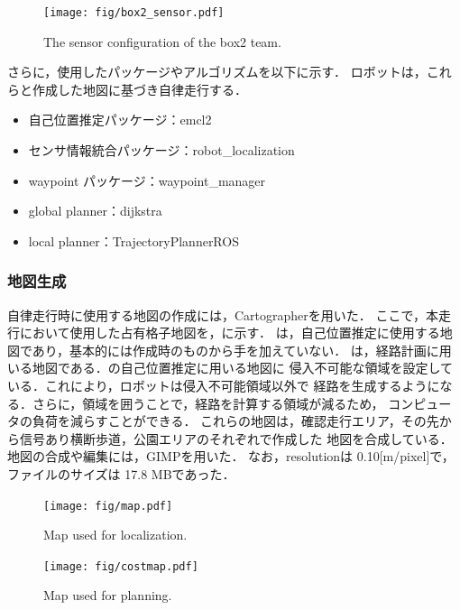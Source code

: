 \documentclass[twocolumn, 9pt]{jsproceedings}
\begin{document}
\begin{figure}[h!]
  \centering
  \texttt{[image: fig/box2\_sensor.pdf]}
  \caption{The sensor configuration of the box2 team.}
  \label{fig:box2-sensor}
\end{figure}


さらに，使用したパッケージやアルゴリズムを以下に示す．
ロボットは，これらと作成した地図に基づき自律走行する．

\begin{itemize}
  \item 自己位置推定パッケージ：emcl2\cite{emcl2}
  \item センサ情報統合パッケージ：robot\_localization\cite{robotlocalization}
  \item waypoint パッケージ：waypoint\_manager\cite{waypoint}
  \item global planner：dijkstra
  \item local planner：TrajectoryPlannerROS
\end{itemize}


\subsubsection{地図生成}
自律走行時に使用する地図の作成には，Cartographer\cite{Cartographer}を用いた．
ここで，本走行において使用した占有格子地図を，に示す．
は，自己位置推定に使用する地図であり，基本的には作成時のものから手を加えていない．
は，経路計画に用いる地図である．の自己位置推定に用いる地図に
侵入不可能な領域を設定している．これにより，ロボットは侵入不可能領域以外で
経路を生成するようになる．さらに，領域を囲うことで，経路を計算する領域が減るため，
コンピュータの負荷を減らすことができる．
これらの地図は，確認走行エリア，その先から信号あり横断歩道，公園エリアのそれぞれで作成した
地図を合成している．地図の合成や編集には，GIMP\cite{gimp}を用いた．
なお，resolutionは 0.10[m/pixel]で，ファイルのサイズは 17.8 MBであった．

\begin{figure}[h!]
  \centering
  \texttt{[image: fig/map.pdf]}
  \caption{Map used for localization.}
  \label{fig:map}
\end{figure}
\vspace*{-2mm}
\begin{figure}[h!]
  \centering
  \texttt{[image: fig/costmap.pdf]}
  \caption{Map used for planning.}
  \label{fig:costmap}
\end{figure}
\end{document}
